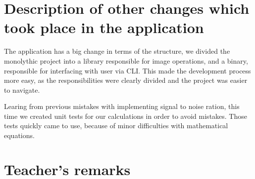 \documentclass[12pt]{article}
\begin{document}
\section{Description of other changes which took place in the application}

The application has a big change in terms of the structure, 
we divided the monolythic project into a library responsible for image operations,
and a binary, responsible for interfacing with user via CLI.
This made the development process more easy, as the responsibilities were clearly divided and the project was easier to navigate.

Learing from previous mistakes with implementing signal to noise ration,
this time we created unit tests for our calculations in order to avoid mistakes.
Those tests quickly came to use, because of minor difficulties with mathematical equations.

\vfill
\section*{Teacher's remarks}
\begin{tabularx}{\textwidth}{|X|}
    \hline
    \vspace{7cm}
    \phantom{.} \\
    \hline
\end{tabularx}
\end{document}
